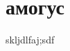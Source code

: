 \documentclass[a4paper,12pt]{extarticle}
\begin{document}
\setcounter{page}{1}


\section{амогус}

skljdlfaj;sdf
\end{document}
